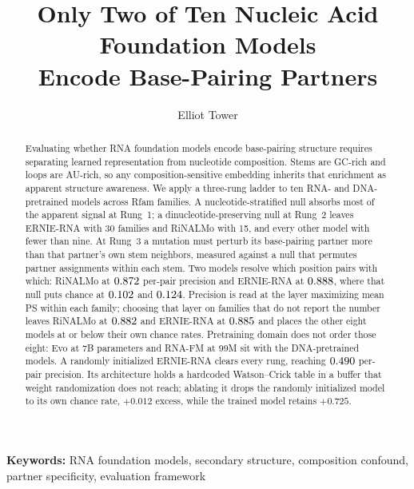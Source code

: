 \documentclass[11pt]{article}
\title{Only Two of Ten Nucleic Acid Foundation Models\\Encode Base-Pairing Partners}
\author{Elliot Tower}
\affil{Independent researcher \\ \texttt{elliot@elliottower.ai}}
\date{}
\begin{document}
\maketitle

\noindent\textbf{Keywords:} RNA foundation models, secondary structure, composition confound, partner specificity, evaluation framework

\begin{abstract}
Evaluating whether RNA foundation models encode base-pairing structure requires
separating learned representation from nucleotide composition. Stems are GC-rich
and loops are AU-rich, so any composition-sensitive embedding inherits that
enrichment as apparent structure awareness. We apply a three-rung ladder to ten
RNA- and DNA-pretrained models across \panelN{} Rfam families. A
nucleotide-stratified null absorbs most of the apparent signal at Rung~1; a
dinucleotide-preserving null at Rung~2 leaves ERNIE-RNA with 30 families and
RiNALMo with 15, and every other model with fewer than nine. At Rung~3 a
mutation must perturb its base-pairing partner more than that partner's own stem
neighbors, measured against a null that permutes partner assignments within
each stem. Two models resolve which position pairs with which: RiNALMo at
$0.872{}$ per-pair precision and ERNIE-RNA at
$0.888{}$, where that null puts chance at
$0.102{}$ and $0.124{}$. Precision is read at the
layer maximizing mean PS within each family; choosing that layer on families
that do not report the number leaves RiNALMo at $0.882{}$ and
ERNIE-RNA at $0.885{}$ and places the other eight models at or
below their own chance rates. Pretraining domain does not order
those eight: Evo at 7B parameters and RNA-FM at 99M sit with the
DNA-pretrained models.
A randomly initialized ERNIE-RNA clears every rung, reaching
$0.490{}$ per-pair precision. Its architecture holds a hardcoded Watson--Crick table in a buffer
that weight randomization does not reach; ablating it drops the randomly
initialized model to its own chance rate, $+0.012$ excess, while the trained
model retains $+0.725$.
\end{abstract}
\end{document}
